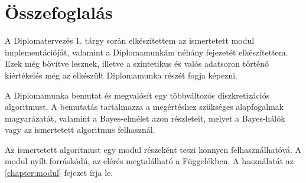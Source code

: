 \chapter{Összefoglalás}

A Diplomatervezés 1. tárgy során elkészítettem az ismertetett modul implementációját, valamint a Diplomamunkám néhány fejezetét elkészítettem. Ezek még bővítve lesznek, illetve a szintetikus és valós adatsoron történő kiértékelés még az elkészült Diplomamunka részét fogja képezni.

A Diplomamunka bemutat és megvalósít egy többváltozós diszkretizációs algoritmust. A bemutatás tartalmazza a megértéshez szükséges alapfogalmak magyarázatát, valamint a Bayes-elmélet azon részleteit, melyet a Bayes-hálók vagy az ismertetett algoritmus felhasznál.

Az ismertetett algoritmust egy modul részeként teszi könnyen felhasználhatóvá. A modul nyílt forráskódú, az elérés megtalálható a Függelékben. A használatát az \ref{chapter:modul} fejezet írja le.

